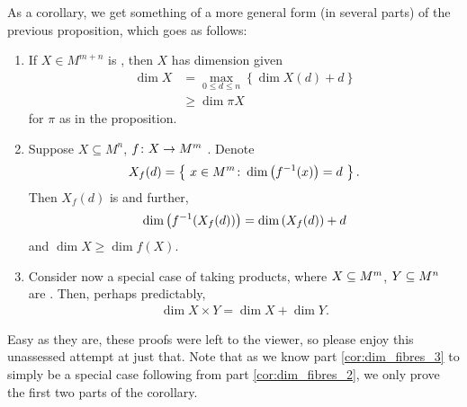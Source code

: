 As a corollary, we get something of a more general form (in several parts) of the previous proposition, which goes as follows:
\begin{corollary}
  \label{cor:dim_fibres}
  \leavevmode
  \begin{enumerate}
    \item \label{cor:dim_fibres_1} If $X \in M^{m + n}$ is , then $X$ has dimension given
      \begin{align*}
        \dim{X} &= \max_{0 \leq d \leq n}{ \left\{ \dim{X(d)} + d \right\} } \\
        &\geq \dim{\pi X}
      \end{align*}
      for $\pi$ as in the proposition.

    \item \label{cor:dim_fibres_2} Suppose $X \subseteq M^n$, $\funcdom{f}{X}{M^m}$ . Denote
      \begin{align*}
        X_f(d) = \left\{ \ x \in M^m \colon \dim{\inv{f}(x)} = d \ \right\}.
      \end{align*}
      Then $X_f(d)$ is  and further,
      \begin{align*}
        \dim{\inv{f}(X_f(d))} = \dim{X_f(d)} + d
      \end{align*}
      and $\dim{X} \geq \dim{f(X)}$.

    \item \label{cor:dim_fibres_3} Consider now a special case of taking products, where $\XMn[X]{m}$, $\XMn[Y]{n}$ are . Then, perhaps predictably,
      \begin{align*}
       \dim{X \times Y} = \dim{X} + \dim{Y}.
      \end{align*}
    \end{enumerate}
\end{corollary}

Easy as they are, these proofs were left to the viewer, so please enjoy this unassessed attempt at just that. Note that as we know part \ref{cor:dim_fibres_3} to simply be a special case following from part \ref{cor:dim_fibres_2}, we only prove the first two parts of the corollary.

